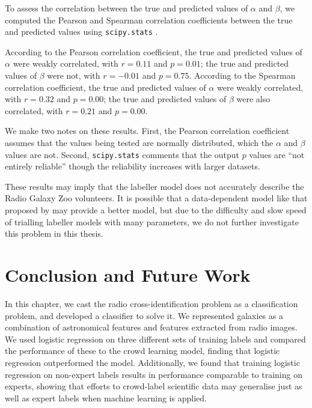     To assess the correlation between the true and predicted values of $\alpha$
    and $\beta$, we computed the Pearson and Spearman correlation coefficients
    between the true and predicted values using \texttt{scipy.stats}
    \citep{scipy}.

    According to the Pearson correlation coefficient, the true and predicted
    values of $\alpha$ were weakly correlated, with $r = 0.11$ and $p = 0.01$;
    the true and predicted values of $\beta$ were not, with $r = -0.01$ and $p =
    0.75$. According to the Spearman correlation coefficient, the true and
    predicted values of $\alpha$ were weakly correlated, with $r = 0.32$ and $p
    = 0.00$; the true and predicted values of $\beta$ were also correlated, with
    $r = 0.21$ and $p = 0.00$.

    We make two notes on these results. First, the Pearson correlation
    coefficient assumes that the values being tested are normally distributed,
    which the $\alpha$ and $\beta$ values are not. Second, \texttt{scipy.stats}
    comments that the output $p$ values are ``not entirely reliable'' though the
    reliability increases with larger datasets.

    These results may imply that the labeller model does not accurately describe
    the Radio Galaxy Zoo volunteers. It is possible that a data-dependent model
    like that proposed by \citeauthor{yan10} may provide a better model, but due
    to the difficulty and slow speed of trialling labeller models with many
    parameters, we do not further investigate this problem in this thesis.

\section{Conclusion and Future Work}
\label{sec:cross-identification-conclusion-future-work}
  
  In this chapter, we cast the radio cross-identification problem as a
  classification problem, and developed a classifier to solve it. We represented
  galaxies as a combination of astronomical features and features extracted from
  radio images. We used logistic regression on three different sets of training
  labels and compared the performance of these to the \citeauthor{raykar10}
  crowd learning model, finding that logistic regression outperformed the
  \citeauthor{raykar10} model. Additionally, we found that training logistic
  regression on non-expert labels results in performance comparable to training
  on experts, showing that efforts to crowd-label scientific data may generalise
  just as well as expert labels when machine learning is applied.

